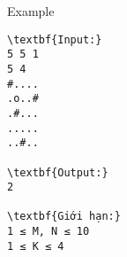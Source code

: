 Example
\begin{verbatim}
\textbf{Input:}
5 5 1
5 4
#....
.o..#
.#...
.....
..#..

\textbf{Output:}
2

\textbf{Giới hạn:}
1 ≤ M, N ≤ 10 
1 ≤ K ≤ 4 

\end{verbatim}